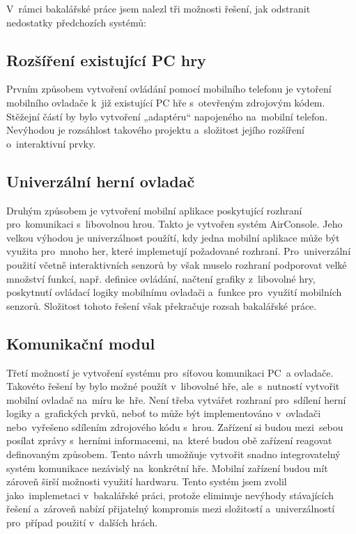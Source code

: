 \documentclass[thesis=B,czech,hidelinks]{FITthesis}[2012/06/26] %
\begin{document}
V~rámci bakalářské práce jsem nalezl tři možnosti řešení, jak odstranit nedostatky předchozích systémů:

\subsection{Rozšíření existující PC hry}

Prvním způsobem vytvoření ovládání pomocí mobilního telefonu je vytoření mobilního ovladače k~již existující PC hře s~otevřeným zdrojovým kódem. Stěžejní částí by bylo vytvoření „adaptéru“ napojeného na~mobilní telefon. Nevýhodou je rozsáhlost takového projektu a~složitost jejího rozšíření o~interaktivní prvky.

\subsection{Univerzální herní ovladač}

Druhým způsobem je vytvoření mobilní aplikace poskytující rozhraní pro~komunikaci s~libovolnou hrou. Takto je vytvořen systém AirConsole. Jeho velkou výhodou je univerzálnost použítí, kdy jedna mobilní aplikace může být využita pro~mnoho her, které implemetují požadované rozhraní. Pro~univerzální použití včetně interaktivních senzorů by však muselo rozhraní podporovat velké množství funkcí, např. definice ovládání, načtení grafiky z~libovolné hry, poskytnutí ovládací logiky mobilnímu ovladači a~funkce pro~využití mobilních senzorů. Složitost tohoto řešení však překračuje rozsah bakalářské práce.

\subsection{Komunikační modul}

Třetí možností je vytvoření systému pro~síťovou komunikaci PC~a ovladače. Takovéto řešení by bylo možné použít v~libovolné hře, ale~s~nutností vytvořit mobilní ovladač na~míru ke~hře. Není třeba vytvářet rozhraní pro~sdílení herní logiky a~grafických prvků, neboť to může být implementováno v~ovladači nebo~vyřešeno sdílením zdrojového kódu s~hrou. Zařízení si budou mezi~sebou posílat zprávy s~herními informacemi, na~které budou obě zařízení reagovat definovaným způsobem. Tento návrh umožňuje vytvořit snadno integrovatelný systém komunikace nezávislý na~konkrétní hře. Mobilní zařízení budou mít zároveň širší možnosti využití hardwaru. Tento systém jsem zvolil jako~implemetaci v~bakalářské práci, protože eliminuje nevýhody stávajících řešení a~zároveň nabízí přijatelný kompromis mezi složitostí a~univerzálností pro~případ použití v~dalších hrách. 
\end{document}

